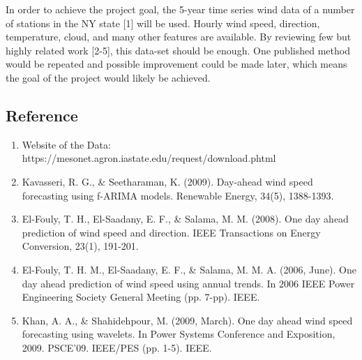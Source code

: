 \documentclass{article}
\begin{document}
In order to achieve the project goal, the 5-year time series wind data of a number of stations in the NY state [1] will be used.  Hourly wind speed, direction, temperature, cloud, and many other features are available.  By reviewing few but highly related work [2-5], this data-set should be enough.  One published method would be repeated and possible improvement could be made later, which means the goal of the project would likely be achieved.\\

\subsection*{Reference}
\begin{enumerate}
 \item Website of the Data: https://mesonet.agron.iastate.edu/request/download.phtml
 \item Kavasseri, R. G., \& Seetharaman, K. (2009). Day-ahead wind speed forecasting using f-ARIMA models. Renewable Energy, 34(5), 1388-1393.
 \item El-Fouly, T. H., El-Saadany, E. F., \& Salama, M. M. (2008). One day ahead prediction of wind speed and direction. IEEE Transactions on Energy Conversion, 23(1), 191-201.
 \item El-Fouly, T. H. M., El-Saadany, E. F., \& Salama, M. M. A. (2006, June). One day ahead prediction of wind speed using annual trends. In 2006 IEEE Power Engineering Society General Meeting (pp. 7-pp). IEEE.
 \item Khan, A. A., \& Shahidehpour, M. (2009, March). One day ahead wind speed forecasting using wavelets. In Power Systems Conference and Exposition, 2009. PSCE'09. IEEE/PES (pp. 1-5). IEEE.
\end{enumerate}
\end{document}
